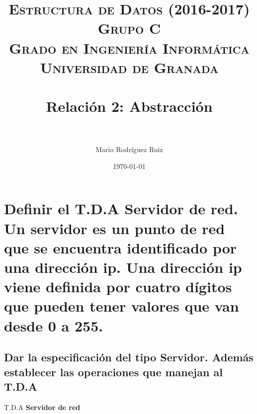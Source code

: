 


\title{	
\normalfont \normalsize 
\textsc{\textbf{Estructura de Datos (2016-2017)} \\ Grupo C \\ Grado en Ingeniería Informática\\ Universidad de Granada} \\ [25pt] %
\horrule{0.5pt} \\[0.4cm] %
\huge Relación 2: Abstracción \\ %
\horrule{2pt} \\[0.5cm] %
}

\author{Mario Rodríguez Ruiz} %

\date{\normalsize\today} %




\maketitle %

\newpage %

\tableofcontents %

\newpage

\section{Definir el T.D.A Servidor de red. Un servidor es un punto de red que se encuentra
	identificado por una dirección ip. Una dirección ip viene definida por cuatro dígitos que
	pueden tener valores que van desde 0 a 255.}
\subsection{Dar la especificación del tipo Servidor. Además establecer las operaciones que
	manejan al T.D.A}
T.D.A \textbf{Servidor de red}\\

